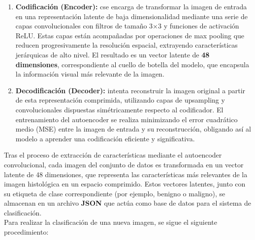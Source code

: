 \documentclass[12pt]{article} %
\begin{document}
\begin{enumerate}
    \item \textbf{Codificación (Encoder):} cse encarga de transformar la imagen de entrada en una representación latente de baja dimensionalidad mediante una serie de capas convolucionales con filtros de tamaño 3×3 y funciones de activación ReLU. Estas capas están acompañadas por operaciones de max pooling que reducen progresivamente la resolución espacial, extrayendo características jerárquicas de alto nivel. El resultado es un vector latente de \textbf{48 dimensiones}, correspondiente al cuello de botella del modelo, que encapsula la información visual más relevante de la imagen.
    \item \textbf{Decodificación (Decoder):} intenta reconstruir la imagen original a partir de esta representación comprimida, utilizando capas de upsampling y convolucionales dispuestas simétricamente respecto al codificador. El entrenamiento del autoencoder se realiza minimizando el error cuadrático medio (MSE) entre la imagen de entrada y su reconstrucción, obligando así al modelo a aprender una codificación eficiente y significativa.
\end{enumerate}

Tras el proceso de extracción de características mediante el autoencoder convolucional, cada imagen del conjunto de datos es transformada en un vector latente de 48 dimensiones, que representa las características más relevantes de la imagen histológica en un espacio comprimido. Estos vectores latentes, junto con su etiqueta de clase correspondiente (por ejemplo, benigno o maligno), se almacenan en un archivo \textbf{JSON} que actúa como base de datos para el sistema de clasificación.\\

Para realizar la clasificación de una nueva imagen, se sigue el siguiente procedimiento:
\end{document}
